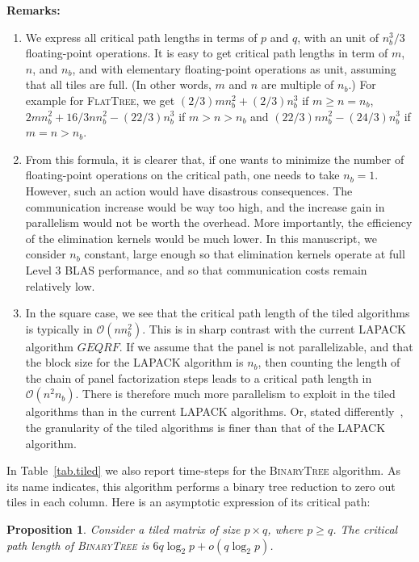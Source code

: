 \documentclass[a4paper,twopages]{article}
\newtheorem{proposition}{Proposition}
\newcommand{\GEQRF}{\ensuremath{\mathit{GEQRF}}\xspace}
\newcommand{\BT}{\textsc{BinaryTree}\xspace}
\newcommand{\FT}{\textsc{FlatTree}\xspace}
\begin{document}
\noindent
\textbf{Remarks:}
\begin{enumerate}

\item We express all critical path lengths in terms of $p$ and $q$, with an unit of
$n_b^3/3$ floating-point operations. It is easy to get critical path
lengths in term of $m$, $n$, and $n_b$, and with elementary floating-point
operations as unit, assuming that all tiles are full.  (In other words, $m$ and $n$ are
multiple of $n_b$.) For example for \FT, we get
$(2/3) mn_b^2 + (2/3) n_b^3$ if $m \geq n=n_b$,
$2mn_b^2 + 16/3nn_b^2 - (22/3)n_b^3$ if $m > n >n_b $
and $(22/3) nn_b^2 - (24/3)n_b^3$ if $m=n > n_b$.

\item From this formula, it is clearer that, if one wants to minimize the number
of floating-point operations on the critical path, one needs to take $n_b=1$.
However, such an action would have disastrous consequences. The communication
increase would be way too high, and the increase gain in parallelism would not be
worth the overhead. More importantly, the efficiency of the elimination kernels would 
be much lower.  In this manuscript, we consider $n_b$ constant, large
enough so that elimination kernels operate at full Level 3 BLAS performance, and so that
communication costs remain relatively low.

\item In the square case, we see that the critical path length of the tiled
algorithms is typically in $\mathcal{O}(n n_b^2)$. This is in sharp contrast
with the current LAPACK algorithm \GEQRF. If we assume that the panel is not
parallelizable, and that the block size for the LAPACK algorithm is $n_b$, then
counting the length of the chain of panel factorization steps leads to a
critical path length in $\mathcal{O}(n^2 n_b)$. There is therefore much more
parallelism to exploit in the tiled algorithms than in the current LAPACK
algorithms. Or, stated differently~\cite{Buttari2008,tileplasma},
the granularity of the tiled algorithms is finer than that of the LAPACK algorithm.

\end{enumerate}

In Table~\ref{tab.tiled} we also report time-steps for the \BT algorithm.
As its name indicates, this algorithm performs a binary tree
reduction to zero out tiles in each column. Here is an asymptotic expression of
its critical path:

\begin{proposition}
\label{th.bt}
Consider a tiled matrix of size $p \times q$, where $p \geq q$. The critical
path length of \BT is $6 q \log_2 p + o(q \log_2 p)$.
\end{proposition}
\end{document}
